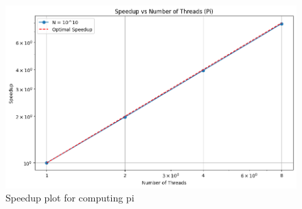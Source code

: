 \begin{figure}[H]
    \centering
        \centering
        \includegraphics[width=\textwidth]{../media/pi_speedup.png}
        \caption{Speedup plot for computing pi}
        \label{fig:pi_speedup}
    \end{figure}

